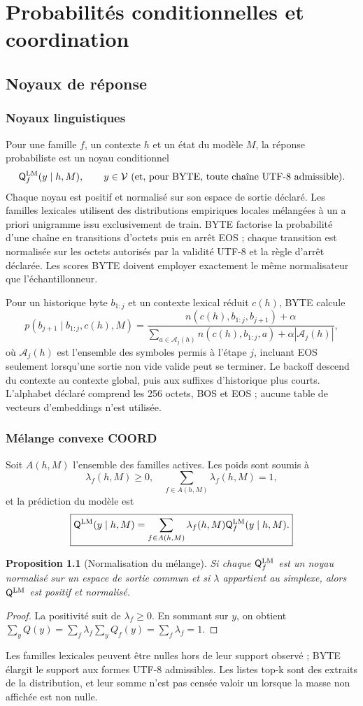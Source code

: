 \documentclass[11pt,a4paper,oneside,openany]{book}
\newtheorem{proposition}[definition]{Proposition}
\begin{document}
\part{Probabilités conditionnelles et coordination}
\chapter{Noyaux de réponse}
\section{Noyaux linguistiques}
Pour une famille $f$, un contexte $h$ et un état du modèle $M$, la réponse probabiliste est un noyau conditionnel
\[
  \mathsf Q_f^{\mathrm{LM}}(y\mid h,M),\qquad y\in\mathcal V\text{ (et, pour BYTE, toute chaîne UTF-8 admissible)}.
\]
Chaque noyau est positif et normalisé sur son espace de sortie déclaré. Les familles lexicales utilisent des distributions empiriques locales mélangées à un a priori unigramme issu exclusivement de train. BYTE factorise la probabilité d'une chaîne en transitions d'octets puis en arrêt EOS ; chaque transition est normalisée sur les octets autorisés par la validité UTF-8 et la règle d'arrêt déclarée. Les scores BYTE doivent employer exactement le même normalisateur que l'échantillonneur.

Pour un historique byte $b_{1:j}$ et un contexte lexical réduit $c(h)$, BYTE calcule
\[
 p(b_{j+1}\mid b_{1:j},c(h),M)=
 \frac{n(c(h),b_{1:j},b_{j+1})+\alpha}
 {\sum_{a\in\mathcal A_j(h)}n(c(h),b_{1:j},a)+\alpha|\mathcal A_j(h)|},
\]
où $\mathcal A_j(h)$ est l'ensemble des symboles permis à l'étape $j$, incluant EOS seulement lorsqu'une sortie non vide valide peut se terminer. Le backoff descend du contexte au contexte global, puis aux suffixes d'historique plus courts. L'alphabet déclaré comprend les 256 octets, BOS et EOS ; aucune table de vecteurs d'embeddings n'est utilisée.

\section{Mélange convexe COORD}
Soit $A(h,M)$ l'ensemble des familles actives. Les poids sont soumis à
\[
 \lambda_f(h,M)\geq0,\quad \sum_{f\in A(h,M)}\lambda_f(h,M)=1,
\]
et la prédiction du modèle est
\[
 \boxed{\mathsf Q^{\mathrm{LM}}(y\mid h,M)=\sum_{f\in A(h,M)}\lambda_f(h,M)\mathsf Q_f^{\mathrm{LM}}(y\mid h,M).}
\]
\begin{proposition}[Normalisation du mélange]
Si chaque $\mathsf Q_f^{\mathrm{LM}}$ est un noyau normalisé sur un espace de sortie commun et si $\lambda$ appartient au simplexe, alors $\mathsf Q^{\mathrm{LM}}$ est positif et normalisé.
\end{proposition}
\begin{proof}
La positivité suit de $\lambda_f\geq0$. En sommant sur $y$, on obtient $\sum_yQ(y)=\sum_f\lambda_f\sum_yQ_f(y)=\sum_f\lambda_f=1$.
\end{proof}
Les familles lexicales peuvent être nulles hors de leur support observé ; BYTE élargit le support aux formes UTF-8 admissibles. Les listes top-k sont des extraits de la distribution, et leur somme n'est pas censée valoir un lorsque la masse non affichée est non nulle.
\end{document}
